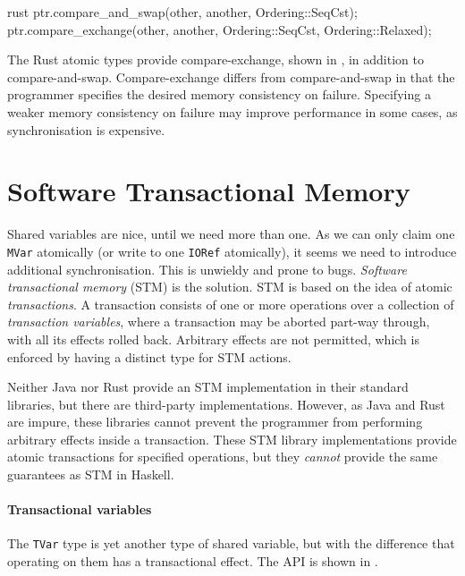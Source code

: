 \begin{listing}
\centering
\begin{cminted}{rust}
ptr.compare_and_swap(other, another, Ordering::SeqCst);
ptr.compare_exchange(other, another, Ordering::SeqCst, Ordering::Relaxed);
\end{cminted}
\caption{Compare-and-swap in Rust.}\label{lst:cas_rust}
\end{listing}

The Rust atomic types provide compare-exchange, shown in
, in addition to compare-and-swap.
Compare-exchange differs from compare-and-swap in that the programmer
specifies the desired memory consistency on failure.  Specifying a
weaker memory consistency on failure may improve performance in some
cases, as synchronisation is expensive.

\section{Software Transactional Memory}
\label{sec:concurrent_haskell-stm}

Shared variables are nice, until we need more than one.  As we can
only claim one \verb|MVar| atomically (or write to one \verb|IORef|
atomically), it seems we need to introduce additional synchronisation.
This is unwieldy and prone to bugs.  \emph{Software transactional
  memory} (STM)\cite{harris2005,shavit1995} is the solution.  STM is
based on the idea of atomic \emph{transactions}.  A transaction
consists of one or more operations over a collection of
\emph{transaction variables}, where a transaction may be aborted
part-way through, with all its effects rolled back.  Arbitrary effects
are not permitted, which is enforced by having a distinct type for STM
actions.

Neither Java nor Rust provide an STM implementation in their standard
libraries, but there are third-party implementations.  However, as
Java and Rust are impure, these libraries cannot prevent the
programmer from performing arbitrary effects inside a transaction.
These STM library implementations provide atomic transactions for
specified operations, but they \emph{cannot} provide the same
guarantees as STM in Haskell.

\paragraph{Transactional variables}
The \verb|TVar| type is yet another type of shared variable, but with
the difference that operating on them has a transactional effect.  The
API is shown in .


